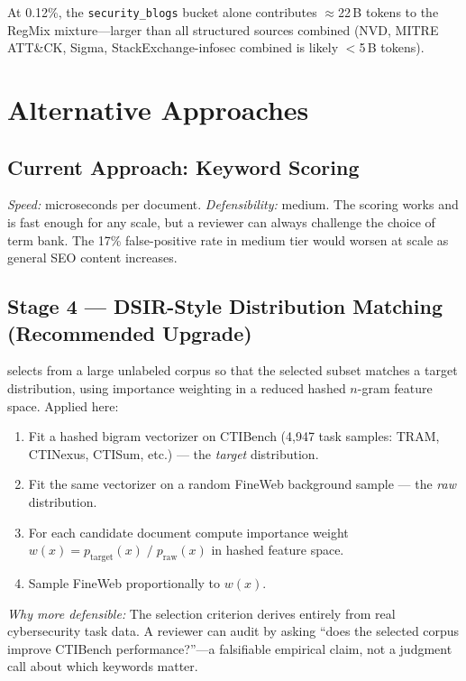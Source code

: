 \documentclass[11pt]{article}
\begin{document}
At 0.12\%, the \texttt{security\_blogs} bucket alone contributes $\approx$22\,B tokens
to the RegMix mixture---larger than all structured sources combined (NVD, MITRE ATT\&CK,
Sigma, StackExchange-infosec combined is likely $<$5\,B tokens).

\section{Alternative Approaches}

\subsection{Current Approach: Keyword Scoring}

\textit{Speed:} microseconds per document.
\textit{Defensibility:} medium.
The scoring works and is fast enough for any scale, but a reviewer can always challenge
the choice of term bank. The 17\% false-positive rate in medium tier would worsen at
scale as general SEO content increases.

\subsection{Stage 4 --- DSIR-Style Distribution Matching (Recommended Upgrade)}

\cite{xie2023data} selects from a large unlabeled corpus so that the selected subset
matches a target distribution, using importance weighting in a reduced hashed
$n$-gram feature space. Applied here:

\begin{enumerate}[leftmargin=1.5em]
    \item Fit a hashed bigram vectorizer on CTIBench \cite{tihanyi2024ctibench}
          (4{,}947 task samples: TRAM, CTINexus, CTISum, etc.) --- the
          \textit{target} distribution.
    \item Fit the same vectorizer on a random FineWeb background sample --- the
          \textit{raw} distribution.
    \item For each candidate document compute importance weight
          $w(x) = p_{\text{target}}(x)\;/\;p_{\text{raw}}(x)$ in hashed feature space.
    \item Sample FineWeb proportionally to $w(x)$.
\end{enumerate}

\textit{Why more defensible:}
The selection criterion derives entirely from real cybersecurity task data.
A reviewer can audit by asking ``does the selected corpus improve CTIBench performance?''---a
falsifiable empirical claim, not a judgment call about which keywords matter.
\end{document}
